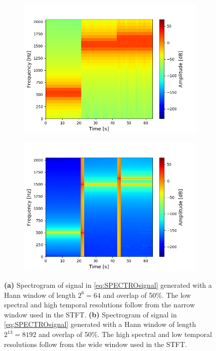 \begin{figure}[H]
\centering
\begin{subfigure}{0.49\textwidth}
\centering
\includegraphics[width=\textwidth]{figures/validation/stft/1.png}
\caption{}
\label{fig:test_stft2}
\end{subfigure}
\begin{subfigure}{0.49\textwidth}
\centering
\includegraphics[width=\textwidth]{figures/validation/stft/2.png}
\caption{}
\label{fig:test_stft1}
\end{subfigure}
\caption{\textbf{(a)} Spectrogram of signal in \eqref{eq:SPECTROsignal} generated with a Hann window of length $2^6=64$ and overlap of 50\%. The low spectral and high temporal resolutions follow from the narrow window used in the STFT. \textbf{(b)} Spectrogram of signal in \eqref{eq:SPECTROsignal} generated with a Hann window of length $2^{13}=8192$ and overlap of 50\%. The high spectral and low temporal resolutions follow from the wide window used in the STFT.}
\label{fig:test_stft}
\end{figure}

